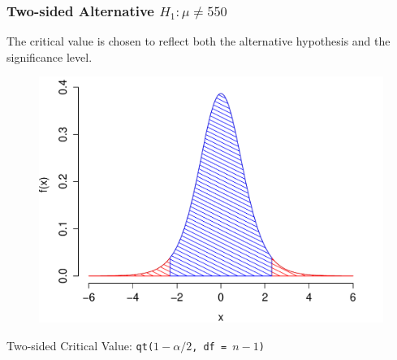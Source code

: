 \documentclass[handout]{beamer}
\begin{document}
\begin{frame}
\frametitle{Two-sided Alternative $H_1\colon \mu \neq 550$}
The critical value is chosen to reflect both the alternative hypothesis and the significance level. 
\begin{figure}
\includegraphics[scale = 0.45]{./images/two_side}
\end{figure}
Two-sided Critical Value: \texttt{qt($1-\alpha/2$, df  = $n-1$)}
\end{frame}
\end{document}
